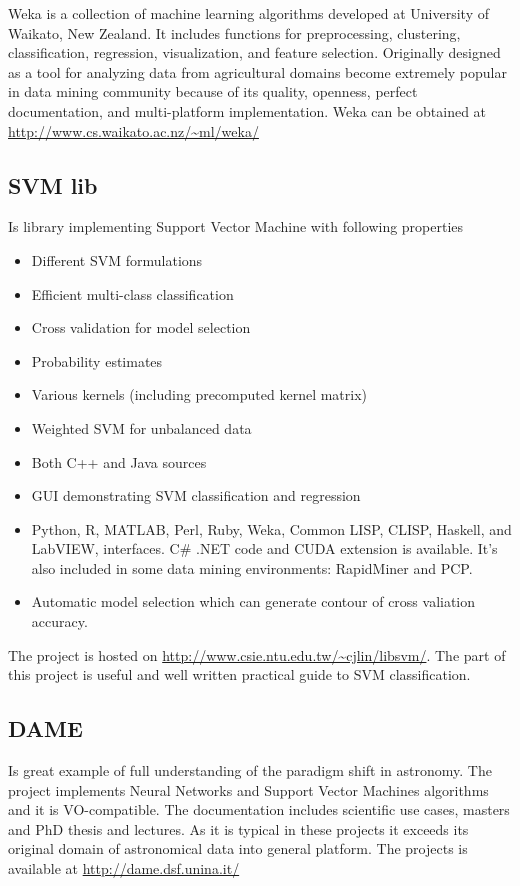 Weka is a collection of machine learning algorithms developed at
University of Waikato, New Zealand. It includes functions for
preprocessing, clustering, classification, regression, visualization,
and feature selection. Originally designed as a tool for analyzing
data from agricultural domains become extremely popular in data mining
community because of its quality, openness, perfect documentation, and
multi-platform implementation. Weka can be obtained at
\url{http://www.cs.waikato.ac.nz/~ml/weka/}



\subsection{SVM lib}
Is library implementing Support Vector Machine with following properties
\begin{itemize}
    \item Different SVM formulations
    \item Efficient multi-class classification
    \item Cross validation for model selection
    \item Probability estimates
    \item Various kernels (including precomputed kernel matrix)
    \item Weighted SVM for unbalanced data
    \item Both C++ and Java sources
    \item GUI demonstrating SVM classification and regression
    \item Python, R, MATLAB, Perl, Ruby, Weka, Common LISP, CLISP,
      Haskell, and LabVIEW, interfaces. C\# .NET code and CUDA
      extension is available.  It's also included in some data mining
      environments: RapidMiner and PCP.
    \item Automatic model selection which can generate contour of
      cross valiation accuracy.
\end{itemize}

The project is hosted on
\url{http://www.csie.ntu.edu.tw/~cjlin/libsvm/}.  The part of this
project is useful and well written practical guide to SVM
classification.

\subsection{DAME}

Is great example of full understanding of the paradigm shift in
astronomy. The project implements Neural Networks and Support Vector
Machines algorithms and it is VO-compatible. The documentation includes
scientific use cases, masters and PhD thesis and lectures. As it is
typical in these projects it exceeds its original domain of
astronomical data into general platform. The projects is available at
\url{http://dame.dsf.unina.it/}

